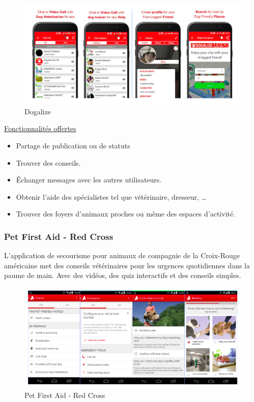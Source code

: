 \documentclass[11pt,a4paper,oneside]{book}
\begin{document}
	\begin{figure}[H]
		\centering
		\includegraphics[width=1\textwidth]{Images/Ch1/Dogalize}
		\caption{Dogalize}
		\label{fig:dogalize}
	\end{figure}
	
	\underline{Fonctionnalités offertes}
	\begin{itemize}
		\item Partage de publication ou de statuts 
		\item Trouver des conseils.
		\item Échanger messages avec les autres utilisateurs.
		\item Obtenir l’aide des spécialistes tel que vétérinaire, dresseur, …
		\item Trouver des foyers d’animaux proches ou même des espaces d’activité.
	\end{itemize}
	\subsubsection{Pet First Aid - Red Cross}
	L'application de secourisme pour animaux de compagnie de la Croix-Rouge américaine met des conseils vétérinaires pour les urgences quotidiennes dans la paume de main. Avec des vidéos, des quiz interactifs et des conseils simples.\\
	\begin{figure}[H]
		\centering
		\includegraphics[width=1\textwidth]{"Images/Ch1/Pet first aid"}
		\caption{Pet First Aid - Red Cross}
		\label{fig:pet-first-aid}
	\end{figure}
	
\end{document}
